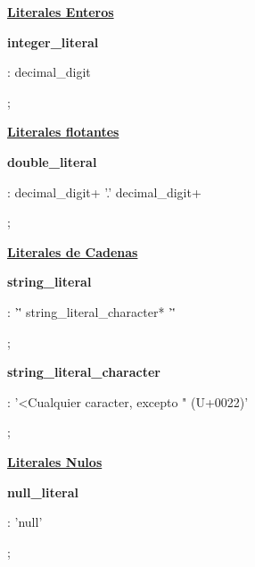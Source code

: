 \documentclass[12pt, letterpaper,spanish]{article}
\theoremstyle{definition}
\theoremstyle{remark}
\begin{document}
	\underline{\textbf{Literales Enteros}}\par
	\textbf{integer\_literal}\par
	: decimal\_digit\par
	;\par
	
	\underline{\textbf{Literales flotantes}}\par
	\textbf{double\_literal}\par
	: decimal\_digit+ '.' decimal\_digit+\par
	;\par
	
	\underline{\textbf{Literales de Cadenas}}\par
	\textbf{string\_literal}\par
	: '\"' string\_literal\_character* '\"'\par
	;\par
	
	\textbf{string\_literal\_character}\par
	: '<Cualquier caracter, excepto " (U+0022)'\par
	;\par
	
	\underline{\textbf{Literales Nulos}}\par
	\textbf{null\_literal}\par
	: 'null'\par
	;\par
	
\end{document}
